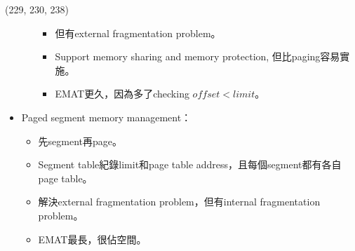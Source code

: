 \begin{theorem}{(229, 230, 238)}
\begin{itemize}
\begin{itemize}
\begin{itemize}
                \item 但有external fragmentation problem。
                \item Support memory sharing and memory protection, 但比paging容易實施。
                \item EMAT更久，因為多了checking $offset < limit$。
            \end{itemize}
        \end{itemize}
        \item Paged segment memory management：\begin{itemize}
            \item 先segment再page。
            \item Segment table紀錄limit和page table address，且每個segment都有各自page table。
            \item 解決external fragmentation problem，但有internal fragmentation problem。
            \item EMAT最長，很佔空間。
        \end{itemize}
    \end{itemize}
\end{theorem}
